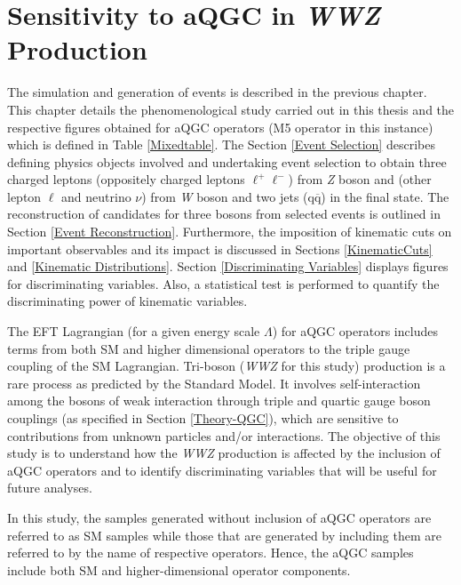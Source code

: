 
\chapter{Sensitivity to aQGC in \textit{WWZ} Production} \label{Chapter4}
The simulation and generation of events is described in the previous chapter. This chapter details the phenomenological study carried out in this thesis and the respective figures obtained for aQGC operators (M5 operator in this instance) which is defined in Table \ref{Mixedtable}. The Section \ref{Event Selection} describes defining  physics objects involved and undertaking event selection to obtain three charged leptons (oppositely charged leptons $\ell^{+}\ell^{-}$) from \textit{Z} boson and (other lepton $\ell$ and neutrino $\nu$) from \textit{W} boson and two jets ($ \text{q}\overline{\text{q}}$) in the final state. The reconstruction of candidates for three bosons from selected events is outlined in Section \ref{Event Reconstruction}. Furthermore, the imposition of kinematic cuts on important observables and its impact is discussed in Sections \ref{KinematicCuts} and \ref{Kinematic Distributions}. Section \ref{Discriminating Variables} displays figures for discriminating variables. Also, a statistical test is performed to quantify the discriminating power of kinematic variables. 

The EFT Lagrangian (for a given energy scale $ \Lambda $) for aQGC operators includes terms from both SM and higher dimensional operators to the triple gauge coupling of the SM Lagrangian. Tri-boson (\textit{WWZ} for this study) production is a rare process as predicted by the Standard Model. It involves self-interaction among the bosons of weak interaction through triple and quartic gauge boson couplings (as specified in Section \ref{Theory-QGC}), which are sensitive to contributions from unknown particles and/or interactions. The objective of this study is to understand how the \textit{WWZ} production is affected by the inclusion of aQGC operators and to identify discriminating variables that will be useful for future analyses.

In this study, the samples generated without inclusion of aQGC operators are referred to as SM samples while those that are generated by including them are referred to by the name of respective operators. Hence, the aQGC samples include both SM and higher-dimensional operator components. %

